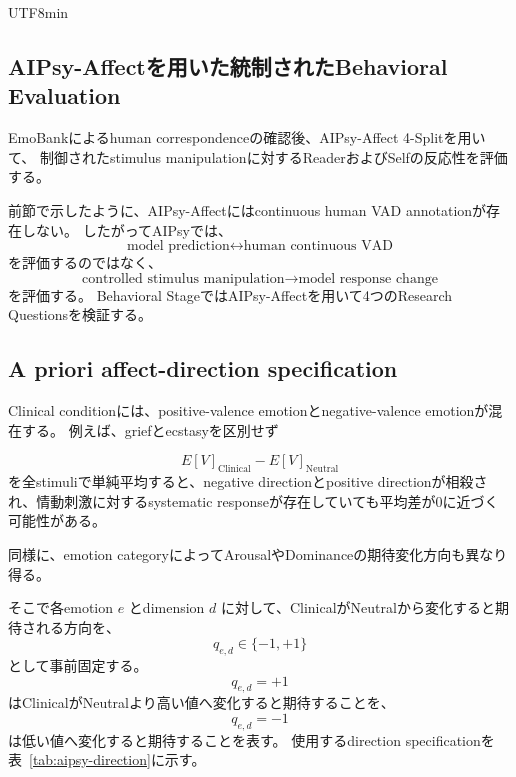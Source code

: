 \documentclass{article} %
\begin{document}
\begin{CJK*}{UTF8}{min}
\subsection{AIPsy-Affectを用いた統制されたBehavioral Evaluation}
\label{app:behavioral-aipsy}

EmoBankによるhuman correspondenceの確認後、AIPsy-Affect 4-Splitを用いて、
制御されたstimulus manipulationに対するReaderおよびSelfの反応性を評価する。

前節で示したように、AIPsy-Affectにはcontinuous human VAD annotationが存在しない。
したがってAIPsyでは、
\[
\text{model prediction}
\leftrightarrow
\text{human continuous VAD}
\]
を評価するのではなく、
\[
\text{controlled stimulus manipulation}
\rightarrow
\text{model response change}
\]
を評価する。
Behavioral StageではAIPsy-Affectを用いて4つのResearch Questionsを検証する。


\subsection{A priori affect-direction specification}
\label{app:aipsy-direction}

Clinical conditionには、positive-valence emotionとnegative-valence emotionが混在する。
例えば、griefとecstasyを区別せず

\[
E[V]_{\mathrm{Clinical}}
-
E[V]_{\mathrm{Neutral}}
\]
を全stimuliで単純平均すると、negative directionとpositive directionが相殺され、情動刺激に対するsystematic responseが存在していても平均差が0に近づく可能性がある。

同様に、emotion categoryによってArousalやDominanceの期待変化方向も異なり得る。

そこで各emotion \(e\) とdimension \(d\) に対して、ClinicalがNeutralから変化すると期待される方向を、
\[
q_{e,d}
\in
\{-1,+1\}
\]
として事前固定する。
\[
q_{e,d}=+1
\]
はClinicalがNeutralより高い値へ変化すると期待することを、
\[
q_{e,d}=-1
\]
は低い値へ変化すると期待することを表す。
使用するdirection specificationを表~\ref{tab:aipsy-direction}に示す。


\end{CJK*}
\end{document}
